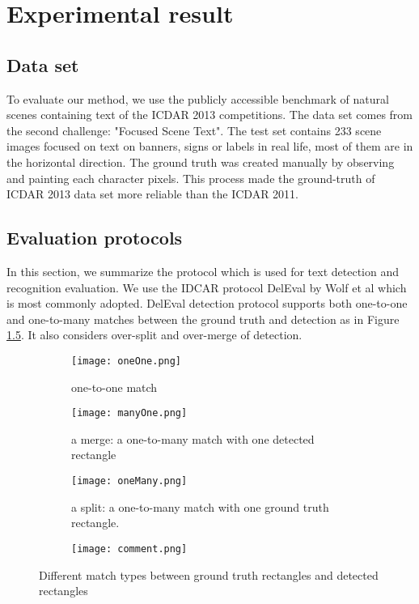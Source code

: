 
\graphicspath{ {6chapterExperimental/image/} }
\chapter{Experimental result}
\section{Data set} \label{test_set}
To evaluate our method, we use the publicly accessible benchmark of natural scenes containing text of the ICDAR 2013 competitions. The data set comes from the second challenge: "Focused Scene Text". The test set contains 233 scene images focused on text on banners, signs or labels in real life, most of them are in the horizontal direction. The ground truth was created manually by observing and painting each character pixels. This process made the ground-truth of ICDAR 2013 data set more reliable than the ICDAR 2011.   
 
\section{Evaluation protocols}
In this section, we summarize the protocol which is used for text detection and recognition evaluation. We use the IDCAR protocol DelEval by Wolf et al \cite{WolfIJDAR2006} which is most commonly adopted. DelEval detection protocol supports both one-to-one and one-to-many matches between the ground truth and detection as in Figure \ref{fig:GroundTruthMatch}. It also considers over-split and over-merge of detection.
\begin{figure}
\begin{center}


	\begin{subfigure}[b]{\textwidth}
	 	\texttt{[image: oneOne.png]} \centering \caption{one-to-one match}\label{fig:oneOne} \end{subfigure}
		
	\begin{subfigure}[b]{\textwidth}
		\texttt{[image: manyOne.png]} \centering	 \caption{a merge: a one-to-many match with one detected rectangle}\label{fig:manyOne} \end{subfigure}		 	
	 	
	\begin{subfigure}[b]{\textwidth}
		\texttt{[image: oneMany.png]} \centering	 \caption{a split: a one-to-many match with one ground truth rectangle.}\label{fig:oneMany} \end{subfigure}	


	
	\begin{subfigure}[b]{\textwidth}
		\texttt{[image: comment.png]} \centering	 \caption{}\label{fig:comment} \end{subfigure}
\end{center}
	\caption[Example of ground truth match types] {Different match types between ground truth rectangles and detected rectangles}
	\label{fig:GroundTruthMatch}
\end{figure}

